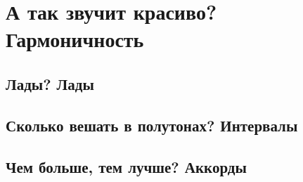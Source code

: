 \chapter{А так звучит красиво? Гармоничность}
\label{ch:harmony}

\section{Лады? Лады}
\label{ch:harmony:lad}

\section{Сколько вешать в полутонах? Интервалы}
\label{ch:harmony:interval}

\section{Чем больше, тем лучше? Аккорды}
\label{ch:harmony:chords}
